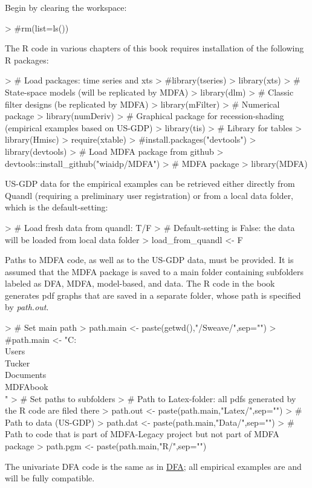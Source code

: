 \documentclass[a4paper]{book}
\begin{document}
Begin by clearing the workspace: 
\begin{Schunk}
\begin{Sinput}
> #rm(list=ls())
\end{Sinput}
\end{Schunk}
The R code in   various chapters of this book requires installation of the following R packages:
\begin{Schunk}
\begin{Sinput}
> # Load packages: time series and xts
> #library(tseries)
> library(xts)
> # State-space models (will be replicated by MDFA) 
> library(dlm)
> # Classic filter designs (be replicated by MDFA)
> library(mFilter)
> # Numerical package 
> library(numDeriv)
> # Graphical package for recession-shading (empirical examples based on US-GDP)
> library(tis)
> # Library for tables
> library(Hmisc)
> require(xtable)
> #install.packages("devtools")
> library(devtools)
> # Load MDFA package from github
> devtools::install_github("wiaidp/MDFA")
> # MDFA package
> library(MDFA)
\end{Sinput}
\end{Schunk}
US-GDP data for the empirical examples can be retrieved either directly from 
 Quandl (requiring a preliminary user registration) or from a local data folder,
  which is the default-setting:
\begin{Schunk}
\begin{Sinput}
> # Load fresh data from quandl: T/F
> #   Default-setting is False: the data will be loaded from local data folder
> load_from_quandl <- F
\end{Sinput}
\end{Schunk}
Paths to MDFA code, as well as to the US-GDP data, must be provided. 
 It is assumed that the MDFA package is saved to a main folder containing
 subfolders labeled as DFA, MDFA, model-based, and data. 
The R code in the book generates pdf graphs that are saved in a separate folder, 
whose path is specified by {\em path.out}.
\begin{Schunk}
\begin{Sinput}
> # Set main path
> path.main <- paste(getwd(),"/Sweave/",sep="")
> #path.main <- "C:\\Users\\Tucker\\Documents\\MDFAbook\\"
> # Set paths to subfolders
>   # Path to Latex-folder: all pdfs generated by the R code are filed there
> path.out <- paste(path.main,"Latex/",sep="")
>   # Path to data (US-GDP)
> path.dat <- paste(path.main,"Data/",sep="")
>   # Path to code that is part of MDFA-Legacy project but not part of MDFA package 
> path.pgm <- paste(path.main,"R/",sep="")
\end{Sinput}
\end{Schunk}
The univariate DFA code is the same as in \href{http://blog.zhaw.ch/sef/files/2014/10/DFA.pdf}{DFA}; all 
 empirical examples are and will be fully compatible. 
\end{document}
